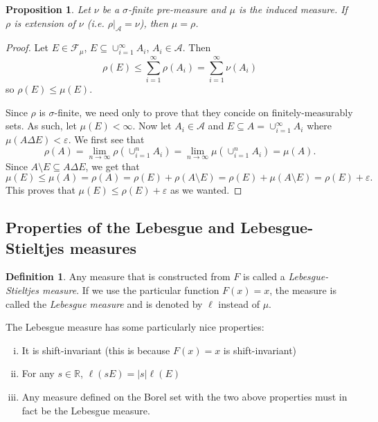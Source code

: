 \documentclass{article}
\newtheorem{proposition}[theorem]{Proposition}
\theoremstyle{definition}
\newtheorem{definition}[theorem]{Definition}
\begin{document}
\begin{proposition}
    Let \( \nu \) be a \( \sigma \)-finite pre-measure and \(\mu\) is the
    induced measure. If \( \rho \) is extension of \(\nu\) (i.e. \(
    \rho \big\vert_{\mathcal{A}} = \nu \)), then \( \mu = \rho \).
\end{proposition}
\begin{proof}
    Let \( E \in \mathcal{F}_{\mu} \), \( E \subseteq \cup_{i = 1}^{\infty}
    A_{i} \), \( A_{i} \in \mathcal{A} \). Then
    \begin{displaymath}
        \rho(E) \leq \sum_{i = 1}^{\infty} \rho(A_{i}) = \sum_{i =
        1}^{\infty}
        \nu(A_{i})
    \end{displaymath}
    so \( \rho(E) \leq \mu(E) \).

    Since \( \rho \) is \(\sigma\)-finite,
    we need only to prove that they concide on finitely-measurably sets. As such, let \( \mu(E) < \infty
    \). Now let \( A_{i} \in \mathcal{A} \) and \( E \subseteq A = \cup_{i
    = 1}^{\infty} A_{i}
    \) where \( \mu(A \Delta E) < \varepsilon \). We first see that
    \begin{displaymath}
        \rho(A) = \lim_{n \to \infty} \rho(\cup_{i = 1}^{n} A_{i})
        = \lim_{n \to \infty} \mu(\cup_{i = 1}^{n} A_{i}) = \mu(A).
    \end{displaymath}
    Since \( A \setminus E \subseteq A \Delta E \), we get that
    \begin{displaymath}
        \mu(E) \leq \mu(A) = \rho(A)
        = \rho(E) + \rho(A \setminus E)
        = \rho(E) + \mu(A \setminus E)
        = \rho(E) + \varepsilon.
    \end{displaymath}
    This proves that \( \mu(E) \leq \rho(E) + \varepsilon \) as we wanted.
\end{proof}


\subsection{Properties of the Lebesgue and Lebesgue-Stieltjes measures}

\begin{definition}
    Any measure that is constructed from $F$ is called a
    \emph{Lebesgue-Stieltjes measure}.  If we use the particular function \(
    F(x) = x \), the measure is called the \emph{Lebesgue measure} and is
    denoted by \( \ell \) instead of \( \mu \).
\end{definition}

The Lebesgue measure has some particularly nice properties:
\begin{enumerate}[i)]
    \item It is shift-invariant (this is because \( F(x) = x \) is
        shift-invariant)
    \item For any \( s \in \mathbb{R} \), \( \ell(sE) = |s| \ell(E) \)
    \item Any measure defined on the Borel set with the two above properties
        must in fact be the Lebesgue measure.
\end{enumerate}
\end{document}

